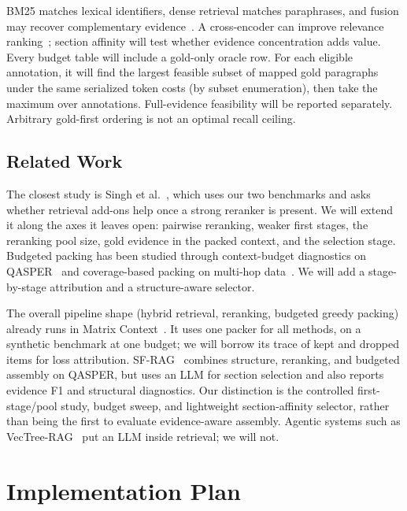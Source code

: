 \documentclass[sigconf, nonacm]{acmart}
\begin{document}
BM25 matches lexical identifiers, dense retrieval matches paraphrases, and fusion may recover complementary evidence~\cite{bruch2023fusion}. A cross-encoder can improve relevance ranking~\cite{nogueira2019bert}; section affinity will test whether evidence concentration adds value. Every budget table will include a gold-only oracle row. For each eligible annotation, it will find the largest feasible subset of mapped gold paragraphs under the same serialized token costs (by subset enumeration), then take the maximum over annotations. Full-evidence feasibility will be reported separately. Arbitrary gold-first ordering is not an optimal recall ceiling.

\subsection{Related Work}

The closest study is Singh et al.~\cite{singh2026beyond}, which uses our two benchmarks and asks whether retrieval add-ons help once a strong reranker is present. We will extend it along the axes it leaves open: pairwise reranking, weaker first stages, the reranking pool size, gold evidence in the packed context, and the selection stage. Budgeted packing has been studied through context-budget diagnostics on QASPER~\cite{kim2026evidence} and coverage-based packing on multi-hop data~\cite{bala2026recall}. We will add a stage-by-stage attribution and a structure-aware selector.

The overall pipeline shape (hybrid retrieval, reranking, budgeted greedy packing) already runs in Matrix Context~\cite{matrixcontext}. It uses one packer for all methods, on a synthetic benchmark at one budget; we will borrow its trace of kept and dropped items for loss attribution. SF-RAG~\cite{yu2026sfrag} combines structure, reranking, and budgeted assembly on QASPER, but uses an LLM for section selection and also reports evidence F1 and structural diagnostics. Our distinction is the controlled first-stage/pool study, budget sweep, and lightweight section-affinity selector, rather than being the first to evaluate evidence-aware assembly. Agentic systems such as VecTree-RAG~\cite{zhong2026vectree} put an LLM inside retrieval; we will not.



\section{Implementation Plan}
\end{document}
